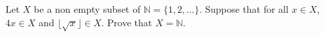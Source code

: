 Let $X$ be a non empty subset of $\mathbb{N} = \{1,2,\ldots \}$. Suppose that for all $x \in X$,  $4x \in X$ and $\lfloor \sqrt{x} \rfloor \in X$. Prove that $X=\mathbb{N}$.